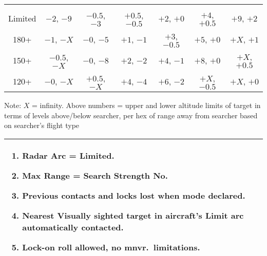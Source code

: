 \begin{twocolumntable}
\begin{tabularx}{0.8\linewidth}{c*{6}{C}}
\toprule
{}&
&
&
&
&
&
\\
\\
\midrule
Limited&$-2$, $-9$&$-0.5$, $-3$&$+0.5$, $-0.5$&$+2$, $+0$&$+4$, $+0.5$&$+9$, $+2$\\
180+&$-1$, $-X$&$-0$, $-5$&$+1$, $-1$&$+3$, $-0.5$&$+5$, $+0$&$+X$, $+1$\\
150+&$-0.5$, $-X$&$-0$, $-8$&$+2$, $-2$&$+4$, $-1$&$+8$, $+0$&$+X$, $+0.5$\\
120+&$-0$, $-X$&$+0.5$, $-X$&$+4$, $-4$&$+6$, $-2$&$+X$, $-0.5$&$+X$, $+0$\\
\bottomrule
\end{tabularx}

\medskip

\begin{tablenote}{0.8\linewidth}
Note: $X$ = infinity. Above numbers = upper and lower altitude limits of target in terms of levels above/below searcher, per hex of range away from searcher based on searcher's flight type 
\end{tablenote}

\end{twocolumntable}


\begin{onecolumntable}
\begin{tabularx}{\linewidth}{X}
\toprule
\begin{enumerate}
    \item Radar Arc = Limited.
    \item Max Range = Search Strength No.
    \item Previous contacts and locks lost when mode declared.
    \item Nearest Visually sighted target in aircraft's Limit arc automatically contacted.
    \item Lock-on roll allowed, no mnvr.\ limitations.
\end{enumerate}
\\
\bottomrule
\end{tabularx}
\end{onecolumntable}

